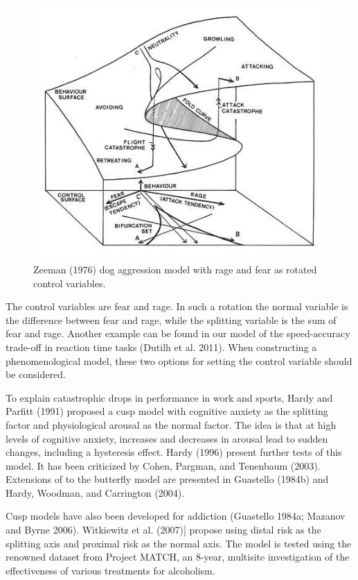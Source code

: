 \documentclass[
  a4paper,
  DIV=11,
  numbers=noendperiod,
  oneside]{scrreprt}
\begin{document}
\begin{figure}

{\centering \includegraphics{media/ch3/image17.jpg}

}

\caption{\label{fig-ch3-img17-old-29}Zeeman (1976) dog aggression model
with rage and fear as rotated control variables.}

\end{figure}

The control variables are fear and rage. In such a rotation the normal
variable is the difference between fear and rage, while the splitting
variable is the sum of fear and rage. Another example can be found in
our model of the speed-accuracy trade-off in reaction time tasks (Dutilh
et al. 2011). When constructing a phenomenological model, these two
options for setting the control variable should be considered.

To explain catastrophic drops in performance in work and sports, Hardy
and Parfitt (1991) proposed a cusp model with cognitive anxiety as the
splitting factor and physiological arousal as the normal factor. The
idea is that at high levels of cognitive anxiety, increases and
decreases in arousal lead to sudden changes, including a hysteresis
effect. Hardy (1996) present further tests of this model. It has been
criticized by Cohen, Pargman, and Tenenbaum (2003). Extensions of to the
butterfly model are presented in Guastello (1984b) and Hardy, Woodman,
and Carrington (2004).

Cusp models have also been developed for addiction (Guastello 1984a;
Mazanov and Byrne 2006). Witkiewitz et al. (2007){]} propose using
distal risk as the splitting axis and proximal risk as the normal axis.
The model is tested using the renowned dataset from Project MATCH, an
8-year, multisite investigation of the effectiveness of various
treatments for alcoholism.
\end{document}
